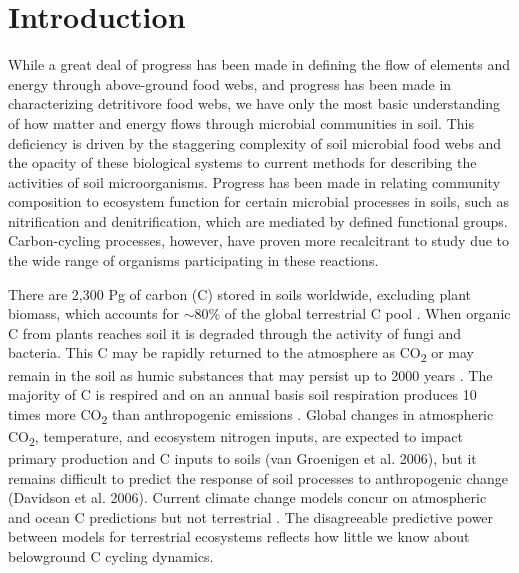 \section{Introduction}
While a great deal of progress has been made in defining the flow of elements and energy through above-ground food webs, and progress has been made in characterizing detritivore food webs, we have only the most basic understanding of how matter and energy flows through microbial communities in soil. This deficiency is driven by the staggering complexity of soil microbial food webs and the opacity of these biological systems to current methods for describing the activities of soil microorganisms. Progress has been made in relating community composition to ecosystem function for certain microbial processes in soils, such as nitrification and denitrification, which are mediated by defined functional groups. Carbon-cycling processes, however, have proven more recalcitrant to study due to the wide range of organisms participating in these reactions.
 
There are 2,300 Pg of carbon (C) stored in soils worldwide, excluding plant biomass, which accounts for $\sim$80\% of the global terrestrial C pool \cite{Amundson_2001,Mendelsohn_2001,IPCC2007Synth,elsen_Ayres_Wall_Bardgett_2011,Lal_2008,BATJES_1996,Lal_2008}. When organic C from plants reaches soil it is degraded through the activity of fungi and bacteria. This C may be rapidly returned to the atmosphere as CO\textsubscript{2} or may remain in the soil as humic substances that may persist up to 2000 years \cite{yanagita1990natural}. The majority of C is respired and on an annual basis soil respiration produces 10 times more CO\textsubscript{2} than anthropogenic emissions \cite{chapin2002principles}. Global changes in atmospheric CO\textsubscript{2}, temperature, and ecosystem nitrogen inputs, are expected to impact primary production and C inputs to soils (van Groenigen et al. 2006), but it remains difficult to predict the response of soil processes to anthropogenic change (Davidson et al. 2006). Current climate change models concur on atmospheric and ocean C predictions but not terrestrial \cite{Friedlingstein_2006}. The disagreeable predictive power between models for terrestrial ecosystems reflects how little we know about belowground C cycling dynamics. 

